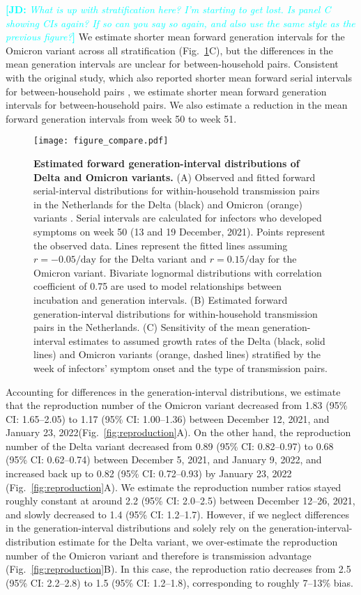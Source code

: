 \documentclass[12pt]{article}
\newcommand{\comment}{\showcomment}
\newcommand{\showcomment}[3]{\textcolor{#1}{\textbf{[#2: }\textsl{#3}\textbf{]}}}
\newcommand{\jd}[1]{\comment{cyan}{JD}{#1}}
\newcommand{\fref}[1]{Fig.~\ref{fig:#1}}
\begin{document}
\jd{What is up with stratification here? I'm starting to get lost. Is panel C showing CIs again? If so can you say so again, and also use the same style as the previous figure?}
We estimate shorter mean forward generation intervals for the Omicron variant across all stratification (\fref{serial}C), but the differences in the mean generation intervals are unclear for between-household pairs.
Consistent with the original study, which also reported shorter mean forward serial intervals for between-household pairs \citep{backer2021omicron}, we estimate shorter mean forward generation intervals for between-household pairs.
We also estimate a reduction in the mean forward generation intervals from week 50 to week 51. 

\begin{figure}[!th]
\texttt{[image: figure\_compare.pdf]}
\caption{
\textbf{Estimated forward generation-interval distributions of Delta and Omicron variants.}
(A) Observed and fitted forward serial-interval distributions for within-household transmission pairs in the Netherlands for the Delta (black) and Omicron (orange) variants \citep{backer2021omicron}.
Serial intervals are calculated for infectors who developed symptoms on week 50 (13 and 19 December, 2021).
Points represent the observed data.
Lines represent the fitted lines assuming $r=-0.05/\textrm{day}$ for the Delta variant and $r=0.15/\textrm{day}$ for the Omicron variant. 
Bivariate lognormal distributions with correlation coefficient of 0.75 are used to model relationships between incubation and generation intervals.
(B) Estimated forward generation-interval distributions for within-household transmission pairs in the Netherlands.
(C) Sensitivity of the mean generation-interval estimates to assumed growth rates of the Delta (black, solid lines) and Omicron variants (orange, dashed lines) stratified by the week of infectors' symptom onset and the type of transmission pairs.
\label{fig:serial}
}
\end{figure}

Accounting for differences in the generation-interval distributions, we estimate that the reproduction number of the Omicron variant decreased from 1.83 (95\% CI: 1.65--2.05) to 1.17 (95\% CI: 1.00--1.36) between December 12, 2021, and January 23, 2022(\fref{reproduction}A).
On the other hand, the reproduction number of the Delta variant decreased from 0.89 (95\% CI: 0.82--0.97) to 0.68 (95\% CI: 0.62--0.74) between December 5, 2021, and January 9, 2022, and increased back up to 0.82 (95\% CI: 0.72--0.93) by January 23, 2022 (\fref{reproduction}A).
We estimate the reproduction number ratios stayed roughly constant at around 2.2 (95\% CI: 2.0--2.5) between December 12--26, 2021, and slowly decreased to 1.4 (95\% CI: 1.2--1.7).
However, if we neglect differences in the generation-interval distributions and solely rely on the generation-interval-distribution estimate for the Delta variant, we over-estimate the reproduction number of the Omicron variant and therefore is transmission advantage (\fref{reproduction}B).
In this case, the reproduction ratio decreases from 2.5 (95\% CI: 2.2--2.8) to 1.5 (95\% CI: 1.2--1.8), corresponding to roughly 7--13\% bias.
\end{document}
